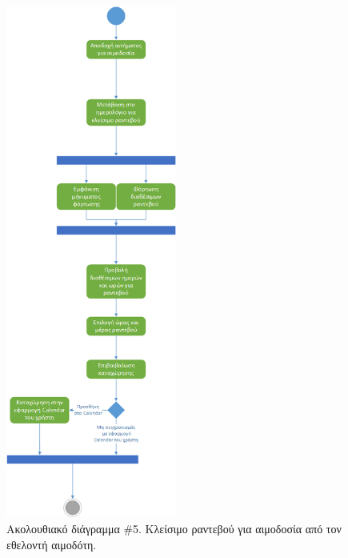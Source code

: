 		
		\begin{figure}[H]
		    \centering
		    \includegraphics[width=0.5\textwidth]{CreateReservation.png}
		    \caption{Ακολουθιακό διάγραμμα \#5. Κλείσιμο ραντεβού για αιμοδοσία από τον εθελοντή αιμοδότη.}
		    \label{fig:createAppoint}
		\end{figure}
		
